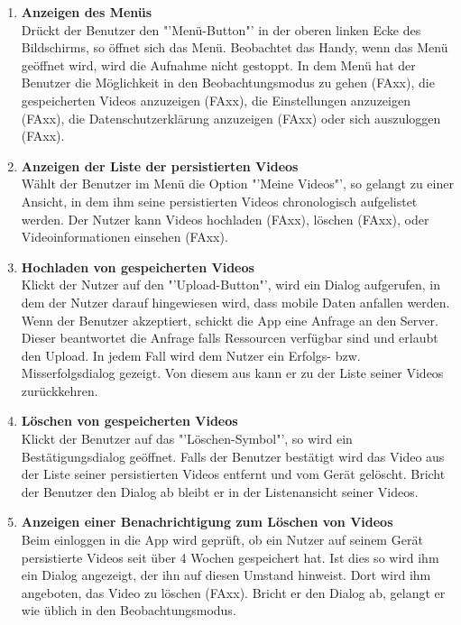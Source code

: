 \begin{enumerate}[\bfseries{FA}10]
\item \textbf{Anzeigen des Menüs} \hfill \\
Drückt der Benutzer den "'Menü-Button"' in der oberen linken Ecke des Bildschirms, so öffnet sich das Menü. Beobachtet das Handy, wenn das Menü geöffnet wird, wird die Aufnahme nicht gestoppt. In dem Menü hat der Benutzer die Möglichkeit in den Beobachtungsmodus zu gehen (FAxx), die gespeicherten Videos anzuzeigen (FAxx), die Einstellungen anzuzeigen (FAxx), die Datenschutzerklärung anzuzeigen (FAxx) oder sich auszuloggen (FAxx).

\item \textbf{Anzeigen der Liste der persistierten Videos} \hfill \\
Wählt der Benutzer im Menü die Option "'Meine Videos"', so gelangt zu einer Ansicht, in dem ihm seine persistierten Videos chronologisch aufgelistet werden. Der Nutzer kann Videos hochladen (FAxx), löschen (FAxx), oder Videoinformationen einsehen (FAxx).

\item \textbf{Hochladen von gespeicherten Videos} \hfill \\
Klickt der Nutzer auf den "'Upload-Button"', wird ein Dialog aufgerufen, in dem der Nutzer darauf hingewiesen wird, dass mobile Daten anfallen werden. Wenn der Benutzer akzeptiert, schickt die App eine Anfrage an den Server. Dieser beantwortet die Anfrage falls Ressourcen verfügbar sind und erlaubt den Upload. In jedem Fall wird dem Nutzer ein Erfolgs- bzw. Misserfolgsdialog gezeigt. Von diesem aus kann er zu der Liste seiner Videos zurückkehren.

\item \textbf{Löschen von gespeicherten Videos} \hfill \\
Klickt der Benutzer auf das "'Löschen-Symbol"', so wird ein Bestätigungsdialog geöffnet. Falls der Benutzer bestätigt wird das Video aus der Liste seiner persistierten Videos entfernt und vom Gerät gelöscht. Bricht der Benutzer den Dialog ab bleibt er in der Listenansicht seiner Videos.

\item \textbf{Anzeigen einer Benachrichtigung zum Löschen von Videos} \hfill \\
Beim einloggen in die App wird geprüft, ob ein Nutzer auf seinem Gerät persistierte Videos seit über 4 Wochen gespeichert hat. Ist dies so wird ihm ein Dialog angezeigt, der ihn auf diesen Umstand hinweist. Dort wird ihm angeboten, das Video zu löschen (FAxx). Bricht er den Dialog ab, gelangt er wie üblich in den Beobachtungsmodus.


\end{enumerate}

